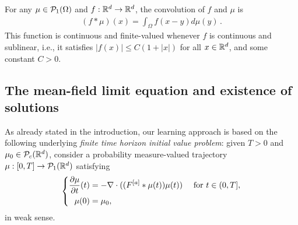 {For any $\mu \in \mathcal{P}_1(\Omega)$ and $f: \mathbb{R}^d \to \mathbb{R}^d$, the convolution of $f$ and $\mu$ is
\begin{align*}
(f * \mu)(x) = \int_{\Omega} f(x-y) d\mu(y)\,.
\end{align*}
This function is continuous and finite-valued whenever $f$ is continuous and sublinear, i.e., it satisfies $| f(x) | \leq C (1 + |x|)$ for all $x \in \mathbb{R}^d$, and some constant $C>0$.}

\subsection{The mean-field limit equation and existence of solutions}

As already stated in the introduction, our learning approach is based on the following underlying \textit{finite time horizon initial value problem}: given $T > 0$ and $\mu_0 \in \mathcal{P}_c(\mathbb{R}^d)$, consider a probability measure-valued trajectory $\mu:[0,T]\rightarrow \mathcal{P}_1(\mathbb{R}^d)$ satisfying 
\begin{align}\label{eq:contdyn}
\left\{\begin{aligned}
\frac{\partial \mu}{\partial t}(t) &= -\nabla \cdot ((F^{[a]}*\mu(t))\mu(t)) \quad \text{ for } t \in (0,T],\\
\mu(0) &=\mu_0,
\end{aligned}\right.
\end{align}
{in weak sense.}

